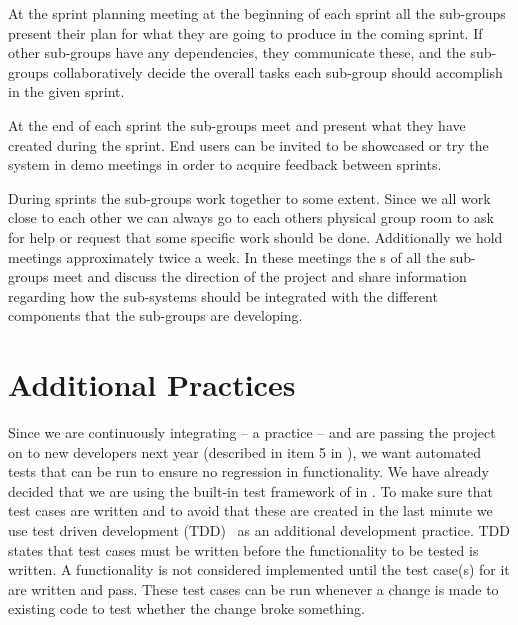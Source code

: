 
At the sprint planning meeting at the beginning of each sprint all the sub-groups present their plan for what they are going to produce in the coming sprint.
If other sub-groups have any dependencies, they communicate these, and the sub-groups collaboratively decide the overall tasks each sub-group should accomplish in the given sprint.

At the end of each sprint the sub-groups meet and present what they have created during the sprint.
End users can be invited to be showcased or try the system in demo meetings in order to acquire feedback between sprints.


During sprints the sub-groups work together to some extent.
Since we all work close to each other we can always go to each others physical group room to ask for help or request that some specific work should be done.
Additionally we hold \sos{} meetings approximately twice a week.
In these meetings the \scrummaster{}s of all the sub-groups meet and discuss the direction of the project and share information regarding how the sub-systems should be integrated with the different components that the sub-groups are developing.


\section{Additional Practices}
Since we are continuously integrating -- a \scrum{} practice -- and are passing the project on to new developers next year (described in item 5 in ), we want automated tests that can be run to ensure no regression in functionality. 
We have already decided that we are using the built-in test framework of \moodle{} in .
To make sure that test cases are written and to avoid that these are created in the last minute we use test driven development (TDD)~\cite[pp.~292-294]{Larman04} as an additional development practice.
TDD states that test cases must be written before the functionality to be tested is written.
A functionality is not considered implemented until the test case(s) for it are written and pass.
These test cases can be run whenever a change is made to existing code to test whether the change broke something.
